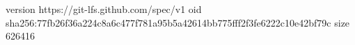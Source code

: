 version https://git-lfs.github.com/spec/v1
oid sha256:77fb26f36a224c8a6c477f781a95b5a42614bb775fff2f3fe6222c10e42bf79c
size 626416
